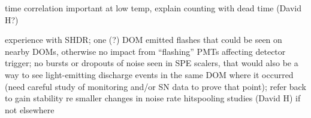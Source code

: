 

time correlation important at low temp, explain counting with dead time (David H?)


experience with SHDR; one (?) DOM emitted flashes that could be seen on nearby DOMs, otherwise no impact from “flashing” PMTs affecting detector trigger; no bursts or dropouts of noise seen in SPE scalers, that would also be a way to see light-emitting discharge events in the same DOM where it occurred (need careful study of monitoring and/or SN data to prove that point); refer back to gain stability re smaller changes in noise rate
hitspooling studies (David H) if not elsewhere
